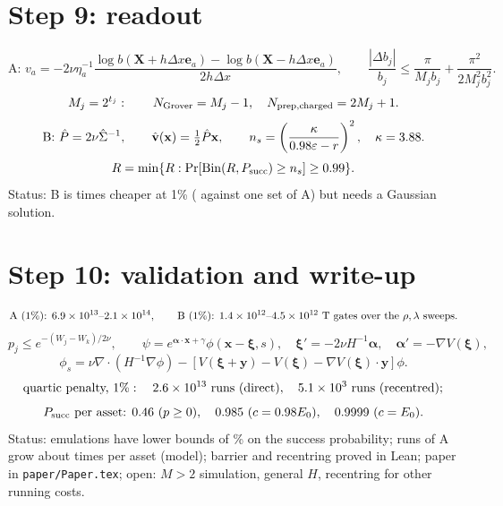 \documentclass[11pt,a4paper]{article}
\begin{document}
\section*{Step 9: readout}
\[
 \text{A: }v_a=-2\nu\eta_a^{-1}\frac{\log b(\mathbf X+h\Delta x\mathbf e_a)
 -\log b(\mathbf X-h\Delta x\mathbf e_a)}{2h\Delta x},\qquad
 \frac{|\Delta b_j|}{b_j}\le\frac{\pi}{M_jb_j}+\frac{\pi^2}{2M_j^2b_j^2}.
\]
\[
 M_j=2^{t_j}:\qquad N_{\rm Grover}=M_j-1,\quad
 N_{\rm prep,charged}=2M_j+1.
\]
\[
 \text{B: }\hat P=2\nu\hat\Sigma^{-1},\qquad
 \hat{\mathbf v}(\mathbf x)=\tfrac12\hat P\mathbf x,\qquad
 n_s=\left(\frac{\kappa}{0.98\varepsilon-r}\right)^2,\quad\kappa=3.88.
\]
\[
 R=\min\{R:\Pr[\operatorname{Bin}(R,P_{\rm succ})\ge n_s]\ge0.99\}.
\]
Status: B is \RatioAB{} times cheaper at 1\% (\RatioABSingle{} against one set of A) but needs a Gaussian solution.

\section*{Step 10: validation and write-up}
\[
 \text{A (1\%): }6.9\times10^{13}\text{--}2.1\times10^{14},\qquad
 \text{B (1\%): }1.4\times10^{12}\text{--}4.5\times10^{12}\ \text{T gates over the }
 \rho,\lambda\text{ sweeps.}
\]
\[
 p_j\le e^{-(W_j-W_k)/2\nu},\qquad
 \psi=e^{\boldsymbol\alpha\cdot\mathbf x+\gamma}\phi(\mathbf x-\boldsymbol\xi,s),\quad
 \boldsymbol\xi'=-2\nu H^{-1}\boldsymbol\alpha,\quad\boldsymbol\alpha'=-\nabla V(\boldsymbol\xi),
\]
\[
 \phi_s=\nu\nabla\!\cdot(H^{-1}\nabla\phi)-[V(\boldsymbol\xi+\mathbf y)-V(\boldsymbol\xi)-\nabla V(\boldsymbol\xi)\cdot\mathbf y]\phi .
\]
\[
 \text{quartic penalty, }1\%:\quad2.6\times10^{13}\ \text{runs (direct)},\quad5.1\times10^{3}\ \text{runs (recentred)};
\]
\[
 P_{\rm succ}\text{ per asset: }0.46\ (p\ge0),\quad0.985\ (c=0.98E_0),\quad0.9999\ (c=E_0).
\]
Status: emulations have lower bounds of \LowerBound\% on the success probability; runs of A grow about \GrowthA{} times per
asset (model); barrier and recentring proved in Lean; paper in \texttt{paper/Paper.tex}; open: $M>2$ simulation,
general $H$, recentring for other running costs.
\end{document}
